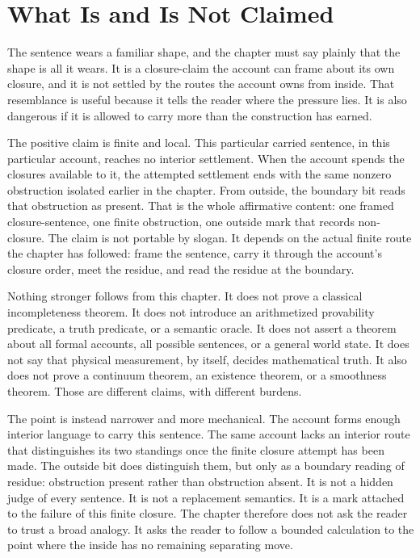 \section{What Is and Is Not Claimed}

The sentence wears a familiar shape, and the chapter must say plainly that the shape is all it
wears. It is a closure-claim the account can frame about its own closure, and it is not settled
by the routes the account owns from inside. That resemblance is useful because it tells the
reader where the pressure lies. It is also dangerous if it is allowed to carry more than the
construction has earned.

The positive claim is finite and local. This particular carried sentence, in this particular
account, reaches no interior settlement. When the account spends the closures available to it,
the attempted settlement ends with the same nonzero obstruction isolated earlier in the chapter.
From outside, the boundary bit reads that obstruction as present. That is the whole affirmative
content: one framed closure-sentence, one finite obstruction, one outside mark that records
non-closure. The claim is not portable by slogan. It depends on the actual finite route the
chapter has followed: frame the sentence, carry it through the account's closure order, meet
the residue, and read the residue at the boundary.

Nothing stronger follows from this chapter. It does not prove a classical incompleteness
theorem. It does not introduce an arithmetized provability predicate, a truth predicate, or a
semantic oracle. It does not assert a theorem about all formal accounts, all possible
sentences, or a general world state. It does not say that physical measurement, by itself,
decides mathematical truth. It also does not prove a continuum theorem, an existence theorem,
or a smoothness theorem. Those are different claims, with different burdens.

The point is instead narrower and more mechanical. The account forms enough interior language
to carry this sentence. The same account lacks an interior route that distinguishes its two
standings once the finite closure attempt has been made. The outside bit does distinguish them,
but only as a boundary reading of residue: obstruction present rather than obstruction absent.
It is not a hidden judge of every sentence. It is not a replacement semantics. It is a mark
attached to the failure of this finite closure. The chapter therefore does not ask the reader
to trust a broad analogy. It asks the reader to follow a bounded calculation to the point where
the inside has no remaining separating move.


